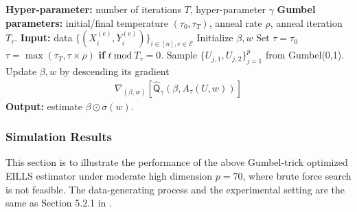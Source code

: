 \documentclass[10pt]{article}
\numberwithin{equation}{section}
\begin{document}
\begin{algorithm}
\caption{Scaling EILLS to High-dimension by Gumbel Trick}
\begin{algorithmic}[1]
\State \textbf{Hyper-parameter: } number of iterations $T$, hyper-parameter $\gamma$
\State \textbf{Gumbel parameters: } initial/final temperature $(\tau_0,\tau_T)$, anneal rate $\rho$, anneal iteration $T_\tau$.
\State \textbf{Input:} data $\{(X^{(e)}_i, Y^{(e)}_i)\}_{i\in [n], e\in \mathcal{E}}$
\State Initialize $\beta, w$
\State Set $\tau = \tau_0$
    \State $\tau = \max(\tau_T, \tau \times \rho)$ \textbf{if} $t ~\mathrm{mod}~ T_\tau = 0$.
    \State Sample $\{U_{j,1}, U_{j,2}\}_{j=1}^p$ from Gumbel(0,1).
    \State Update $\beta, w$ by descending its gradient
        \begin{align*}
                \nabla_{(\beta, w)} \left[\hat{\mathsf{Q}}_\gamma(\beta, A_\tau(U, w))\right]
        \end{align*}
\EndFor
\State \textbf{Output:} estimate $\beta \odot \sigma(w)$. 
\end{algorithmic}
\label{algo1}
\end{algorithm}

\subsubsection{Simulation Results}

This section is to illustrate the performance of the above Gumbel-trick optimized EILLS estimator under moderate high dimension $p=70$, where brute force search is not feasible. The data-generating process and the experimental setting are the same as Section 5.2.1 in \cite{gu2024causality}. 
\end{document}

